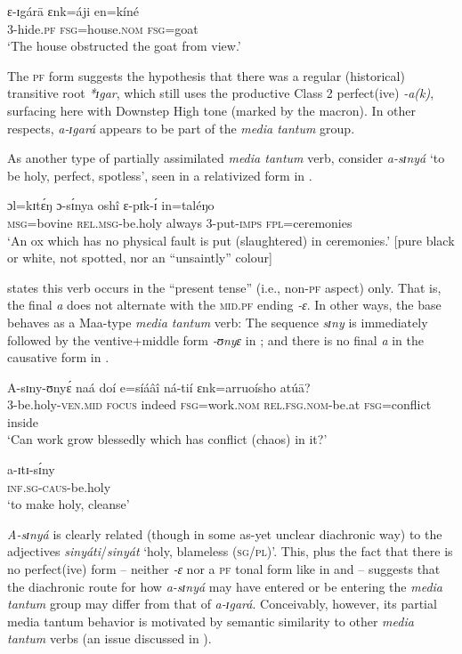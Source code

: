 \documentclass[output=paper,colorlinks,citecolor=brown
]{langscibook}
\begin{document}
\ea \label{ex:Payne:obstructed}
\gll ɛ-ɪgárā	ɛnk=áji	en=kíné 	\\
3-hide.\textsc{pf}	\textsc{fsg}=house.\textsc{nom}	\textsc{fsg}=goat 	\\
\glt ‘The house obstructed the goat from view.’
\z

The \textsc{pf} form suggests the hypothesis that there was a regular (historical) transitive root \textit{*ɪgar}, which still uses the productive Class 2 perfect(ive) \textit{-a(k)}, surfacing here with Downstep High tone (marked by the macron). In other respects, \textit{a-ɪgará} appears to be part of the \textit{media tantum} group.

As another type of partially assimilated \textit{media tantum} verb, consider \textit{a-sɪnyá} `to be holy, perfect, spotless', seen in a relativized form in .

\ea\label{ex:Payne:holy}
\gll ɔl=kɪtɛ́ŋ	ɔ-sɪ́nya	oshî ɛ-pɪk-ɪ́	in=taléŋo \\
\textsc{msg}=bovine	\textsc{rel.msg}-be.holy	always	3-put-\textsc{imps}	\textsc{fpl}=ceremonies \\
\glt `An ox which has no physical fault is put (slaughtered) in ceremonies.' [pure black or white, not spotted, nor an ``unsaintly” colour]
\z 

\citet[372]{Mol1996} states this verb occurs in the ``present tense” (i.e., non-\textsc{pf} aspect) only. That is, the final \textit{a} does not alternate with the \textsc{mid.pf} ending \textit{-ɛ}. In other ways, the base behaves as a Maa-type \textit{media tantum} verb: The sequence \textit{sɪny} is immediately followed by the ventive+middle form \textit{-ʊnyɛ} in ; and there is no final \textit{a} in the causative form in .

\ea \label{ex:Payne:blessed}
\gll A-sɪny-ʊnyɛ́		naá	doí		e=síáâî ná-tií	ɛnk=arruoísho	atúā?\\
3-be.holy-\textsc{ven.mid} 	\textsc{focus}	indeed \textsc{fsg}=work.\textsc{nom} \textsc{rel.fsg.nom}-be.at	\textsc{fsg}=conflict	inside \\
\glt ‘Can work grow blessedly which has conflict (chaos) in it?'
\z 

\ea \label{ex:Payne:caus-holy}
\gll a-ɪtɪ-sɪ́ny \\
\textsc{inf.sg-caus}-be.holy \\
\glt ‘to make holy, cleanse’
\z 

\textit{A-sɪnyá} is clearly related (though in some as-yet unclear diachronic way) to the adjectives \textit{sinyáti}/\textit{sinyát}  `holy, blameless (\textsc{sg}/\textsc{pl})’. This, plus the fact that there is no perfect(ive) form -- neither \textit{-ɛ }nor a \textsc{pf} tonal form like in  and  -- suggests that the diachronic route for how \textit{a-sɪnyá} may have entered or be entering the \textit{media tantum} group may differ from that of \textit{a-ɪgará}. Conceivably, however, its partial media tantum behavior is motivated by semantic similarity to other \textit{media tantum} verbs (an issue discussed in ).
\end{document}
